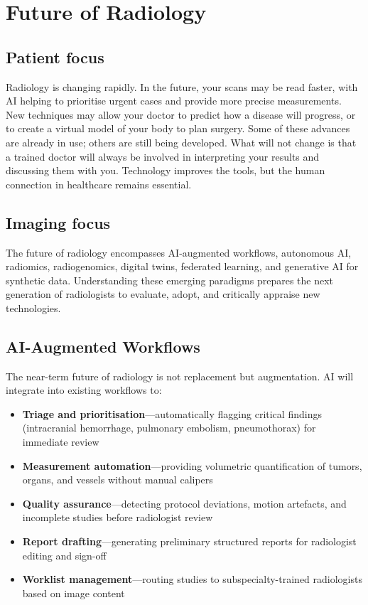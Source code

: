 \chapter{Future of Radiology}

\section*{Patient focus}
Radiology is changing rapidly. In the future, your scans may be read faster, with AI helping to prioritise urgent cases and provide more precise measurements. New techniques may allow your doctor to predict how a disease will progress, or to create a virtual model of your body to plan surgery. Some of these advances are already in use; others are still being developed. What will not change is that a trained doctor will always be involved in interpreting your results and discussing them with you. Technology improves the tools, but the human connection in healthcare remains essential.

\section*{Imaging focus}
The future of radiology encompasses AI-augmented workflows, autonomous AI, radiomics, radiogenomics, digital twins, federated learning, and generative AI for synthetic data. Understanding these emerging paradigms prepares the next generation of radiologists to evaluate, adopt, and critically appraise new technologies.
\label{ch:ch90_future_radiology}

\section{AI-Augmented Workflows}
The near-term future of radiology is not replacement but augmentation. AI will integrate into existing workflows to:
\begin{itemize}
    \item \textbf{Triage and prioritisation}---automatically flagging critical findings (intracranial hemorrhage, pulmonary embolism, pneumothorax) for immediate review
    \item \textbf{Measurement automation}---providing volumetric quantification of tumors, organs, and vessels without manual calipers
    \item \textbf{Quality assurance}---detecting protocol deviations, motion artefacts, and incomplete studies before radiologist review
    \item \textbf{Report drafting}---generating preliminary structured reports for radiologist editing and sign-off
    \item \textbf{Worklist management}---routing studies to subspecialty-trained radiologists based on image content
\end{itemize}

